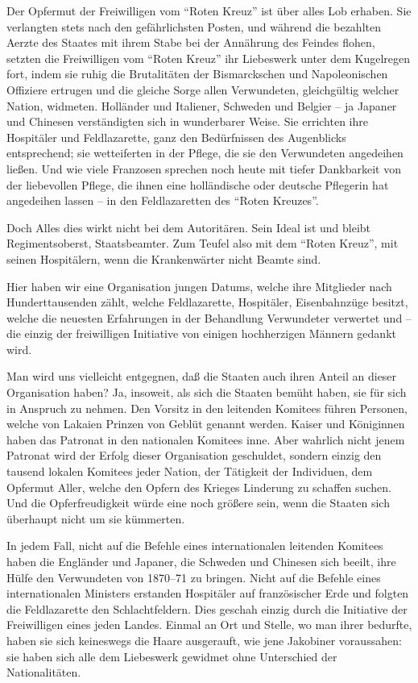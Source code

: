 \documentclass{scrbook}
\begin{document}
Der Opfermut der Freiwilligen vom ``Roten Kreuz'' ist über alles Lob erhaben. Sie verlangten stets nach den gefährlichsten Posten, und während die bezahlten Aerzte des Staates mit ihrem Stabe bei der Annährung des Feindes flohen, setzten die Freiwilligen vom ``Roten Kreuz'' ihr Liebeswerk unter dem Kugelregen fort, indem sie ruhig die Brutalitäten der Bismarckschen und Napoleonischen Offiziere ertrugen und die gleiche Sorge allen Verwundeten, gleichgültig welcher Nation, widmeten. Holländer und Italiener, Schweden und Belgier – ja Japaner und Chinesen verständigten sich in wunderbarer Weise. Sie errichten ihre Hospitäler und Feldlazarette, ganz den Bedürfnissen des Augenblicks entsprechend; sie wetteiferten in der Pflege, die sie den Verwundeten angedeihen ließen. Und wie viele Franzosen sprechen noch heute mit tiefer Dankbarkeit von der liebevollen Pflege, die ihnen eine holländische oder deutsche Pflegerin hat angedeihen lassen – in den Feldlazaretten des ``Roten Kreuzes''.

Doch Alles dies wirkt nicht bei dem Autoritären. Sein Ideal ist und bleibt Regimentsoberst, Staatsbeamter. Zum Teufel also mit dem ``Roten Kreuz'', mit seinen Hospitälern, wenn die Krankenwärter nicht Beamte sind.

Hier haben wir eine Organisation jungen Datums, welche ihre Mitglieder nach Hunderttausenden zählt, welche Feldlazarette, Hospitäler, Eisenbahnzüge besitzt, welche die neuesten Erfahrungen in der Behandlung Verwundeter verwertet und – die einzig der freiwilligen Initiative von einigen hochherzigen Männern gedankt wird.

Man wird uns vielleicht entgegnen, daß die Staaten auch ihren Anteil an dieser Organisation haben? Ja, insoweit, als sich die Staaten bemüht haben, sie für sich in Anspruch zu nehmen. Den Vorsitz in den leitenden Komitees führen Personen, welche von Lakaien Prinzen von Geblüt genannt werden. Kaiser und Königinnen haben das Patronat in den nationalen Komitees inne. Aber wahrlich nicht jenem Patronat wird der Erfolg dieser Organisation geschuldet, sondern einzig den tausend lokalen Komitees jeder Nation, der Tätigkeit der Individuen, dem Opfermut Aller, welche den Opfern des Krieges Linderung zu schaffen suchen. Und die Opferfreudigkeit würde eine noch größere sein, wenn die Staaten sich überhaupt nicht um sie kümmerten.

In jedem Fall, nicht auf die Befehle eines internationalen leitenden Komitees haben die Engländer und Japaner, die Schweden und Chinesen sich beeilt, ihre Hülfe den Verwundeten von 1870–71 zu bringen. Nicht auf die Befehle eines internationalen Ministers erstanden Hospitäler auf französischer Erde und folgten die Feldlazarette den Schlachtfeldern. Dies geschah einzig durch die Initiative der Freiwilligen eines jeden Landes. Einmal an Ort und Stelle, wo man ihrer bedurfte, haben sie sich keineswegs die Haare ausgerauft, wie jene Jakobiner voraussahen: sie haben sich alle dem Liebeswerk gewidmet ohne Unterschied der Nationalitäten.
\end{document}
